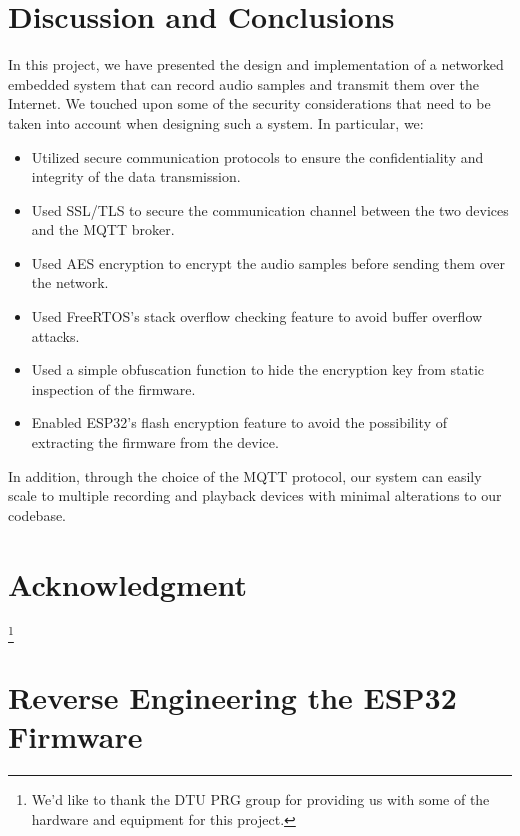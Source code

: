 \documentclass[conference]{IEEEtran}
\begin{document}
\section{Discussion and Conclusions}
\label{sec:discussion_and_conclusions}

In this project, we have presented the design and implementation of a networked embedded system
that can record audio samples and transmit them over the Internet.
We touched upon some of the security considerations that need to be taken into account when designing such a system.
In particular, we:

\begin{itemize}
    \item Utilized secure communication protocols to ensure the confidentiality and integrity of the data transmission.
    \item Used SSL/TLS to secure the communication channel between the two devices and the MQTT broker.
    \item Used AES encryption to encrypt the audio samples before sending them over the network.
    \item Used FreeRTOS's stack overflow checking feature to avoid buffer overflow attacks.
    \item Used a simple obfuscation function to hide the encryption key from static inspection of the firmware.
    \item Enabled ESP32's flash encryption feature to avoid the possibility of extracting the firmware from the device.
\end{itemize}

In addition, through the choice of the MQTT protocol, our system can easily scale to multiple recording and playback devices
with minimal alterations to our codebase.

\section*{Acknowledgment}

\thanks{We'd like to thank the DTU PRG group for providing us with some of the hardware and equipment for this project.}




\appendices
{}

\section{Reverse Engineering the ESP32 Firmware}
\label{appendix:reverse_engineering}
\end{document}
